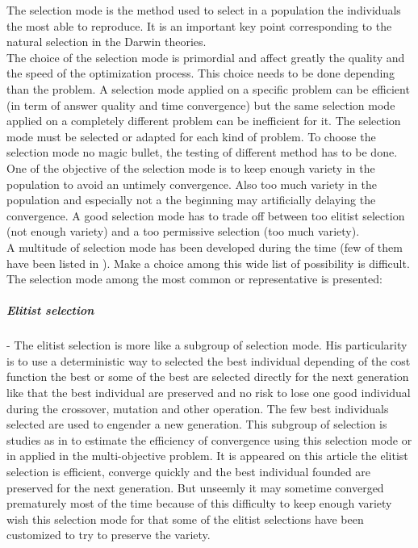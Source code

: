  The selection mode is  the method  used to select in a population the individuals the most able to reproduce. It is an important key point corresponding to the natural selection in the Darwin theories. \\
The choice of the selection mode is primordial and affect greatly the quality and the speed of the optimization process. This choice needs to be done depending than the problem. A selection mode applied on a specific problem  can be efficient (in term of answer quality and time convergence)  but  the same  selection mode applied on  a completely different problem can be inefficient for it.  The selection mode must be selected or adapted for each kind of problem. To choose the selection mode no magic  bullet, the testing of different method has to be done.\\
One of the objective of the selection mode is to keep enough variety in the population to avoid an untimely  convergence. Also too much variety in the population and especially not a the beginning may artificially delaying the convergence. A good selection mode has to trade off between too elitist selection (not enough variety) and a too permissive selection (too much variety). \\
A multitude of selection mode has been developed during the time (few of them have been listed in \cite{123*owais2008}). Make a choice among this wide list of possibility is difficult. The selection mode among the most common  or representative is  presented:    \\

\subparagraph{Elitist selection}
-	The elitist selection is more like a subgroup of selection mode. His particularity is to use a deterministic way to selected the best individual depending of the cost function the best or some of the best are selected directly for the next generation like that the best individual are preserved and no risk  to lose one good individual during the crossover, mutation and other operation. The few best individuals selected are used to engender a new generation.
  This subgroup of selection is studies as in \cite{69*deb2000,64*matsui1999}  to estimate the efficiency of convergence using this selection mode or in \cite{140*soremekun2001} applied in the multi-objective problem. It is appeared on this article the elitist selection is efficient, converge quickly and the best individual founded are preserved  for the next generation. But unseemly it may sometime converged prematurely most of the time because of this difficulty to keep enough variety wish this selection mode for that some of the elitist selections have been customized to try to preserve the variety. \\
	

